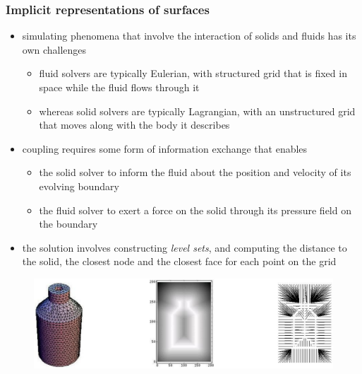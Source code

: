 \begin{frame}[fragile]
%
  \frametitle{Implicit representations of surfaces}
%
  \begin{itemize}
%
  \item simulating phenomena that involve the interaction of solids and fluids has its own
    challenges
    \begin{itemize}
    \item fluid solvers are typically Eulerian, with structured grid that is fixed in space
      while the fluid flows through it
    \item whereas solid solvers are typically Lagrangian, with an unstructured grid that moves
      along with the body it describes
    \end{itemize}
%
  \item coupling requires some form of information exchange that enables 
    \begin{itemize}
    \item the solid solver to inform the fluid about the position and velocity of its evolving
      boundary
    \item the fluid solver to exert a force on the solid through its pressure field on the
      boundary
    \end{itemize}
%
  \item the solution involves constructing {\em level sets}, and computing the distance to the
    solid, the closest node and the closest face for each point on the grid
%
  \end{itemize}
%
  \begin{figure}
    \includegraphics[scale=0.4]{figures/mesh-cpt.pdf}
  \end{figure}
%
\end{frame}


